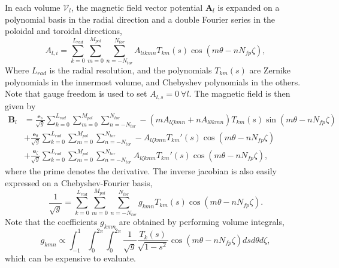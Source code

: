 \documentclass[my_thesis.tex]{subfiles}
\begin{document}
In each volume $\mathcal{V}_l$, the magnetic field vector potential $\mathbf{A}_l$ is  expanded on a polynomial basis in the radial direction and a double Fourier series in the poloidal and toroidal directions,
\begin{equation}
	A_{l,i} = \sum_{k=0}^{L_{rad}}\sum_{m=0}^{M_{pol}}\sum_{n=-N_{tor}}^{N_{tor}} A_{likmn} T_{km}(s)\cos(m\theta-nN_{fp}\zeta),
\end{equation}
Where $L_{rad}$ is the radial resolution, and the polynomials $T_{km}(s)$ are Zernike polynomials in the innermost volume, and Chebyshev polynomials in the others. Note that gauge freedom is used to set $A_{l,s}=0\ \forall l$. The magnetic field is then given by 
\begin{align}
\mathbf{B}_l &=  \frac{\mathbf{e}_s}{\sqrt{g}}\sum_{k=0}^{L_{rad}}\sum_{m=0}^{M_{pol}}\sum_{n=-N_{tor}}^{N_{tor}} -(mA_{l\zeta kmn}+nA_{l\theta kmn})T_{km}(s)\sin(m\theta-nN_{fp}\zeta) \label{eq.bs contravariant}\\
&+ \frac{\mathbf{e}_\theta }{\sqrt{g}}\sum_{k=0}^{L_{rad}}\sum_{m=0}^{M_{pol}}\sum_{n=-N_{tor}}^{N_{tor}} -A_{l\zeta kmn}T_{km}'(s)\cos(m\theta-nN_{fp}\zeta)\label{eq.bt contravariant}\\
&+ \frac{\mathbf{e}_\zeta}{\sqrt{g}}\sum_{k=0}^{L_{rad}}\sum_{m=0}^{M_{pol}}\sum_{n=-N_{tor}}^{N_{tor}} A_{l\zeta kmn}T_{km}'(s)\cos(m\theta-nN_{fp}\zeta),\label{eq.bz contravariant}
\end{align}
where the prime denotes the derivative. The inverse jacobian is also easily expressed on a Chebyshev-Fourier basis,
\begin{equation}
\frac{1}{\sqrt{g}} = \sum_{k=0}^{L_{rad}}\sum_{m=0}^{M_{pol}}\sum_{n=-N_{tor}}^{N_{tor}} g_{kmn}T_{km}(s)\cos(m\theta-nN_{fp}\zeta).
\end{equation}
Note that the coefficients $g_{kmn}$ are obtained by performing volume integrals,
\begin{equation}
   g_{kmn} \propto \int_{-1}^{1} \int_0^{2\pi}\int_0^{2\pi} \frac{1}{\sqrt{g}} \frac{T_k(s)}{\sqrt{1-s^2}}\cos(m\theta-nN_{fp}\zeta)dsd\theta d\zeta, \label{eq. sqrtg volume integral}
\end{equation}
which can be expensive to evaluate.



\end{document}
